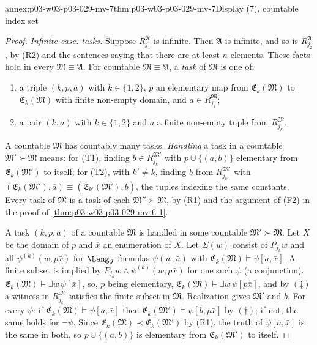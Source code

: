 \begin{annexitem}{annex:p03-w03-p03-029-mv-7}{thm:p03-w03-p03-029-mv-7}{Display (7), countable index set}
\begin{proof}
\emph{Infinite case: tasks.} Suppose \(R_{j_1}^{\mathfrak A}\) is infinite.
Then \(\mathfrak A\) is infinite, and so is \(R_{j_2}^{\mathfrak A}\), by
(R2) and the sentences saying that there are at least \(n\) elements. These
facts hold in every \(\mathfrak M\equiv\mathfrak A\). For countable
\(\mathfrak M\equiv\mathfrak A\), a \emph{task} of \(\mathfrak M\) is one of:
\begin{enumerate}
  \item[(T1)] a triple \((k,p,a)\) with \(k\in\{1,2\}\), \(p\) an elementary
        map from \(\mathfrak E_k(\mathfrak M)\) to \(\mathfrak
        E_k(\mathfrak M)\) with finite non-empty domain, and
        \(a\in R_{j_k}^{\mathfrak M}\);
  \item[(T2)] a pair \((k,\bar a)\) with \(k\in\{1,2\}\) and \(\bar a\) a
        finite non-empty tuple from \(R_{j_k}^{\mathfrak M}\).
\end{enumerate}
A countable \(\mathfrak M\) has countably many tasks. \emph{Handling} a task
in a countable \(\mathfrak M'\succ\mathfrak M\) means: for (T1), finding
\(b\in R_{j_k}^{\mathfrak M'}\) with \(p\cup\{(a,b)\}\) elementary from
\(\mathfrak E_k(\mathfrak M')\) to itself; for (T2), with \(k'\neq k\),
finding \(\bar b\) from \(R_{j_{k'}}^{\mathfrak M'}\) with
\((\mathfrak E_k(\mathfrak M'),\bar a)\equiv(\mathfrak E_{k'}(\mathfrak
M'),\bar b)\), the tuples indexing the same constants. Every task of
\(\mathfrak M\) is a task of each \(\mathfrak M''\succ\mathfrak M\), by
(R1) and the argument of (F2) in the proof of
\cref{thm:p03-w03-p03-029-mv-6-1}.

A task \((k,p,a)\) of a countable \(\mathfrak M\) is handled in some
countable \(\mathfrak M'\succ\mathfrak M\). Let \(X\) be the domain of \(p\)
and \(\bar x\) an enumeration of \(X\). Let \(\Sigma(w)\) consist of
\(P_{j_k}w\) and all \(\psi^{(k)}(w,p\bar x)\) for \(\Lang_J\)-formulas
\(\psi(w,\bar u)\) with \(\mathfrak E_k(\mathfrak M)\models\psi[a,\bar x]\).
A finite subset is implied by \(P_{j_k}w\wedge\psi^{(k)}(w,p\bar x)\) for
one such \(\psi\) (a conjunction). \(\mathfrak E_k(\mathfrak
M)\models\exists w\,\psi[\bar x]\), so, \(p\) being elementary,
\(\mathfrak E_k(\mathfrak M)\models\exists w\,\psi[p\bar x]\), and by
\((\ddagger)\) a witness in \(R_{j_k}^{\mathfrak M}\) satisfies the finite
subset in \(\mathfrak M\). Realization gives \(\mathfrak M'\) and \(b\). For
every \(\psi\): if \(\mathfrak E_k(\mathfrak M)\models\psi[a,\bar x]\) then
\(\mathfrak E_k(\mathfrak M')\models\psi[b,p\bar x]\) by \((\ddagger)\); if
not, the same holds for \(\neg\psi\). Since \(\mathfrak E_k(\mathfrak
M)\prec\mathfrak E_k(\mathfrak M')\) by (R1), the truth of \(\psi[a,\bar
x]\) is the same in both, so \(p\cup\{(a,b)\}\) is elementary from
\(\mathfrak E_k(\mathfrak M')\) to itself.


\end{proof}
\end{annexitem}
